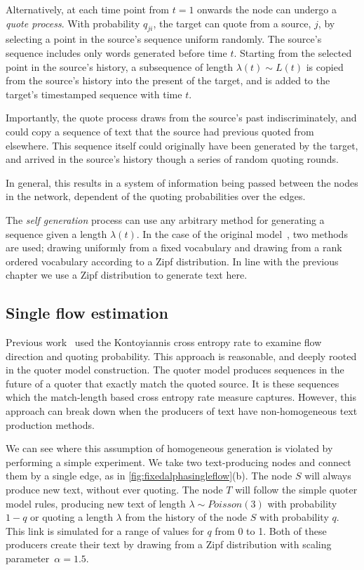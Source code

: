 Alternatively, at each time point from $t=1$ onwards the node can undergo a \emph{quote process}. With probability $q_{ji}$, the target can quote from a source, $j$, by selecting a point in the source's sequence uniform randomly. The source's sequence includes only words generated before time $t$. Starting from the selected point in the source's history, a subsequence of length $\lambda(t) \sim L(t)$ is copied from the source's history into the present of the target, and is added to the target's timestamped sequence with time $t$.

Importantly, the quote process draws from the source's past indiscriminately, and could copy a sequence of text that the source had previous quoted from elsewhere. This sequence itself could originally have been generated by the target, and arrived in the source's history though a series of random quoting rounds. 

In general, this results in a system of information being passed between the nodes in the network, dependent of the quoting probabilities over the edges.

The \emph{self generation} process can use any arbitrary method for generating a sequence given a length $\lambda(t)$. In the case of the original model~\cite{bagrow_quoter_2018}, two methods are used; drawing uniformly from a fixed vocabulary and drawing from a rank ordered vocabulary according to a Zipf distribution. In line with the previous chapter we use a Zipf distribution to generate text here.


\subsection{Single flow estimation} 

Previous work~\cite{bagrow_quoter_2018} used the Kontoyiannis cross entropy rate to examine flow direction and quoting probability. This approach is reasonable, and deeply rooted in the quoter model construction. The quoter model produces sequences in the future of a quoter that exactly match the quoted source. It is these sequences which the match-length based cross entropy rate measure captures. However, this approach can break down when the producers of text have non-homogeneous text production methods.

We can see where this assumption of homogeneous generation is violated by performing a simple experiment. We take two text-producing nodes and connect them by a single edge, as in \autoref{fig:fixedalphasingleflow}(b). The node $S$ will always produce new text, without ever quoting. The node $T$ will follow the simple quoter model rules, producing new text of length $\lambda \sim Poisson(3)$ with probability $1-q$ or quoting a length $\lambda$ from the history of the node $S$ with probability $q$. This link is simulated for a range of values for $q$ from 0 to 1. Both of these producers create their text by drawing from a Zipf distribution with scaling parameter~$\alpha=1.5$.

